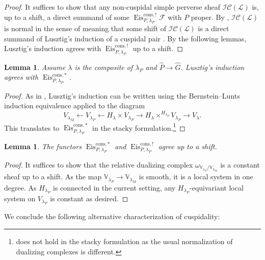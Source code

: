 \documentclass{amsart}
\newtheorem{lemma}[theorem]{Lemma}
\theoremstyle{definition}
\theoremstyle{remark}
\numberwithin{equation}{section}
\newcommand{\mc}{\mathcal}
\newcommand{\wh}{\widehat}
\DeclareMathOperator{\Eis}{\mathrm{Eis}}
\newcommand{\V}{\mathbb{V}}
\begin{document}
\begin{proof}
It suffices to show that any non-cuspidal simple perverse sheaf $\mc{IC}(\mc L)$ is, up to a shift, a direct summand of some $\Eis_{P,\lambda_P}^{\mathrm{cons}, !}\mc F$ with $P$ proper. By \cite[Proposition 7.5]{LusztigGraded}, $\mc{IC}(\mc L)$ is normal in the sense of \cite[\S 7.1]{LusztigGraded} meaning that some shift of $\mc{IC}(\mc L)$ is a direct summand of Lusztig's induction of a cuspidal pair \cite[\S 6]{LusztigGraded}. By the following lemmas, Lusztig's induction agrees with $\Eis_{P,\lambda_P}^{\mathrm{cons}, !}$ up to a shift.  
\end{proof}

\begin{lemma}
Assume $\lambda$ is the composite of $\lambda_P$ and $\wh P \to \wh G$. 
Lusztig's induction \cite[\S 6]{LusztigGraded} agrees with $\Eis_{P, \lambda_P}^{\mathrm{cons},*}$. 
\end{lemma}

\begin{proof}
As in \cite[Lemma 4.3]{Chatterjee}, Lusztig's induction can be written using the Bernstein--Lunts induction equivalence applied to the diagram
\[
V_{\lambda_M} \leftarrow V_{\lambda_P} \leftarrow H_{\lambda}\times V_{\lambda_P} \to H_{\lambda}\times^{H_{\lambda_P}} V_{\lambda_P} \rightarrow V_{\lambda}. 
\]
This translates to $\Eis_{P, \lambda_P}^{\mathrm{cons},*}$ in the stacky formulation.\footnote{\cite[Theorem 4.1]{Chatterjee} does not hold in the stacky formulation as the usual normalization of dualizing complexes is different.}
\end{proof}

\begin{lemma}
The functors $\Eis_{P, \lambda_P}^{\mathrm{cons},*}$ and $\Eis_{P, \lambda_P}^{\mathrm{cons},!}$ agree up to a shift.
\end{lemma}

\begin{proof}
It suffices to show that the relative dualizing complex $\omega_{\V_{\lambda_P} /\V_{\lambda_M}}$ is a constant sheaf up to a shift. As the map $\V_{\lambda_P} \to \V_{\lambda_M}$ is smooth, it is a local system in one degree. As $H_{\lambda_P}$ is connected in the current setting, any $H_{\lambda_P}$-equivariant local system on $V_{\lambda_P}$ is constant as desired. 
\end{proof}

We conclude the following alternative characterization of cuspidality:
\end{document}
